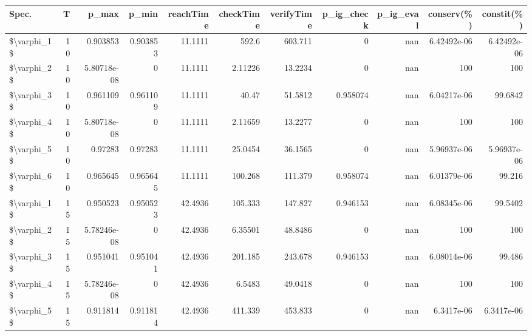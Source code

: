 \begin{tabular}{lrrrrrrrrrr}
\hline
 Spec.       &   T &       p\_max &    p\_min &   reachTime &      checkTime &   verifyTime &   p\_ig\_check &   p\_ig\_eval &    conserv(\%) &    constit(\%) \\
\hline
 \$\textbackslash{}varphi\_1\$ &  10 & 0.903853    & 0.903853 &     11.1111 &  592.6         &     603.711  &     0        &         nan &   6.42492e-06 &   6.42492e-06 \\
 \$\textbackslash{}varphi\_2\$ &  10 & 5.80718e-08 & 0        &     11.1111 &    2.11226     &      13.2234 &     0        &         nan & 100           & 100           \\
 \$\textbackslash{}varphi\_3\$ &  10 & 0.961109    & 0.961109 &     11.1111 &   40.47        &      51.5812 &     0.958074 &         nan &   6.04217e-06 &  99.6842      \\
 \$\textbackslash{}varphi\_4\$ &  10 & 5.80718e-08 & 0        &     11.1111 &    2.11659     &      13.2277 &     0        &         nan & 100           & 100           \\
 \$\textbackslash{}varphi\_5\$ &  10 & 0.97283     & 0.97283  &     11.1111 &   25.0454      &      36.1565 &     0        &         nan &   5.96937e-06 &   5.96937e-06 \\
 \$\textbackslash{}varphi\_6\$ &  10 & 0.965645    & 0.965645 &     11.1111 &  100.268       &     111.379  &     0.958074 &         nan &   6.01379e-06 &  99.216       \\
 \$\textbackslash{}varphi\_1\$ &  15 & 0.950523    & 0.950523 &     42.4936 &  105.333       &     147.827  &     0.946153 &         nan &   6.08345e-06 &  99.5402      \\
 \$\textbackslash{}varphi\_2\$ &  15 & 5.78246e-08 & 0        &     42.4936 &    6.35501     &      48.8486 &     0        &         nan & 100           & 100           \\
 \$\textbackslash{}varphi\_3\$ &  15 & 0.951041    & 0.951041 &     42.4936 &  201.185       &     243.678  &     0.946153 &         nan &   6.08014e-06 &  99.486       \\
 \$\textbackslash{}varphi\_4\$ &  15 & 5.78246e-08 & 0        &     42.4936 &    6.5483      &      49.0418 &     0        &         nan & 100           & 100           \\
 \$\textbackslash{}varphi\_5\$ &  15 & 0.911814    & 0.911814 &     42.4936 &  411.339       &     453.833  &     0        &         nan &   6.3417e-06  &   6.3417e-06  \\

\end{tabular}
